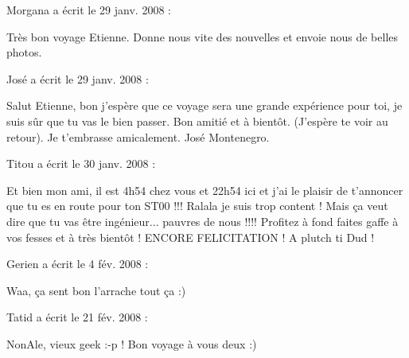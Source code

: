 \medskip
Morgana a écrit le 29 janv. 2008 :
\begin{displayquote}
Très bon voyage Etienne. Donne nous vite des nouvelles et envoie nous de belles photos.
\end{displayquote}

\medskip
José a écrit le 29 janv. 2008 :
\begin{displayquote}
Salut Etienne, bon j'espère que ce voyage sera une grande expérience pour toi, je suis sûr que tu vas le bien passer.
 Bon amitié et à bientôt. (J'espère te voir au retour).
 Je t'embrasse amicalement. José Montenegro.
\end{displayquote}

\medskip
Titou a écrit le 30 janv. 2008 :
\begin{displayquote}
Et bien mon ami, il est 4h54 chez vous et 22h54 ici et j'ai le plaisir de t'annoncer que tu es en route pour ton ST00 !!! Ralala je suis trop content ! Mais ça veut dire que tu vas être ingénieur... pauvres de nous !!!! Profitez à fond faites gaffe à vos fesses et à très bientôt ! ENCORE FELICITATION ! A plutch ti Dud !
\end{displayquote}

\medskip
Gerien a écrit le 4 fév. 2008 :
\begin{displayquote}
Waa, ça sent bon l'arrache tout ça :)
\end{displayquote}

\medskip
Tatid a écrit le 21 fév. 2008 :
\begin{displayquote}
NonAle, vieux geek :-p !
Bon voyage à vous deux :)
\end{displayquote}

\vfill

